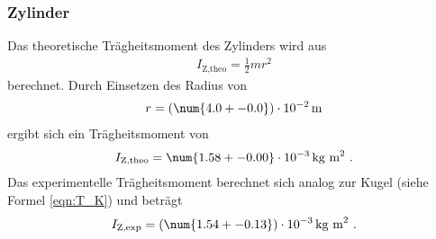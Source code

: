 \subsubsection{Zylinder}
Das theoretische Trägheitsmoment des Zylinders wird aus
\begin{align}
	I_\text{Z,theo} = \frac{1}{2} mr^2
\end{align}
berechnet. Durch Einsetzen des Radius von
\begin{align*}
	r = (\num{4.0 +- 0.0}) \cdot 10^{-2} \, \text{m}
\end{align*}
ergibt sich ein Trägheitsmoment von
\begin{align}
	I_\text{Z,theo} = \num{1.58 +- 0.00} \cdot 10^{-3} \, \text{kg m}^2 \ .
\end{align}
Das experimentelle Trägheitsmoment berechnet sich analog zur Kugel (siehe Formel \ref{eqn:T_K}) und beträgt
\begin{align}
	I_\text{Z,exp} = (\num{1.54 +- 0.13}) \cdot 10^{-3} \, \text{kg m}^2 \ .
\end{align}

